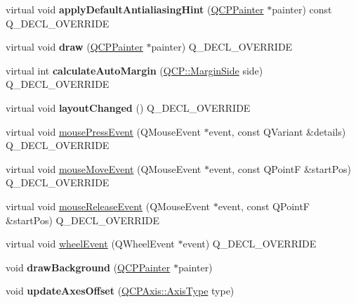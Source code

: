 \begin{DoxyCompactItemize}
\item 
\mbox{\label{classQCPAxisRect_a4a318008e2b7f881a14c3d97186b31f9}} 
virtual void {\bfseries apply\+Default\+Antialiasing\+Hint} (\hyperlink{classQCPPainter}{Q\+C\+P\+Painter} $\ast$painter) const Q\+\_\+\+D\+E\+C\+L\+\_\+\+O\+V\+E\+R\+R\+I\+DE
\item 
\mbox{\label{classQCPAxisRect_af710c50530e370539a4439d6c4db9090}} 
virtual void {\bfseries draw} (\hyperlink{classQCPPainter}{Q\+C\+P\+Painter} $\ast$painter) Q\+\_\+\+D\+E\+C\+L\+\_\+\+O\+V\+E\+R\+R\+I\+DE
\item 
\mbox{\label{classQCPAxisRect_ac51055d83f5f414b6d013d3a24b0a941}} 
virtual int {\bfseries calculate\+Auto\+Margin} (\hyperlink{namespaceQCP_a7e487e3e2ccb62ab7771065bab7cae54}{Q\+C\+P\+::\+Margin\+Side} side) Q\+\_\+\+D\+E\+C\+L\+\_\+\+O\+V\+E\+R\+R\+I\+DE
\item 
\mbox{\label{classQCPAxisRect_a575e38ac71a21906dc2d7b3364db2d62}} 
virtual void {\bfseries layout\+Changed} () Q\+\_\+\+D\+E\+C\+L\+\_\+\+O\+V\+E\+R\+R\+I\+DE
\item 
virtual void \hyperlink{classQCPAxisRect_aa9a7c807eaa4666870ac94aa6abc4dde}{mouse\+Press\+Event} (Q\+Mouse\+Event $\ast$event, const Q\+Variant \&details) Q\+\_\+\+D\+E\+C\+L\+\_\+\+O\+V\+E\+R\+R\+I\+DE
\item 
virtual void \hyperlink{classQCPAxisRect_a9cd27ad8c5cfb49aefd9dbb30def4beb}{mouse\+Move\+Event} (Q\+Mouse\+Event $\ast$event, const Q\+PointF \&start\+Pos) Q\+\_\+\+D\+E\+C\+L\+\_\+\+O\+V\+E\+R\+R\+I\+DE
\item 
virtual void \hyperlink{classQCPAxisRect_a6c89b988d3a0b93c0878f0ebdb5037f4}{mouse\+Release\+Event} (Q\+Mouse\+Event $\ast$event, const Q\+PointF \&start\+Pos) Q\+\_\+\+D\+E\+C\+L\+\_\+\+O\+V\+E\+R\+R\+I\+DE
\item 
virtual void \hyperlink{classQCPAxisRect_a93eeaa0c127d6d6fe8171b2455080262}{wheel\+Event} (Q\+Wheel\+Event $\ast$event) Q\+\_\+\+D\+E\+C\+L\+\_\+\+O\+V\+E\+R\+R\+I\+DE
\item 
\mbox{\label{classQCPAxisRect_ab49d338d1ce74b476fcead5b32cf06dc}} 
void {\bfseries draw\+Background} (\hyperlink{classQCPPainter}{Q\+C\+P\+Painter} $\ast$painter)
\item 
\mbox{\label{classQCPAxisRect_a6024ccdc74f5dc0e8a0fe482e5b28a20}} 
void {\bfseries update\+Axes\+Offset} (\hyperlink{classQCPAxis_ae2bcc1728b382f10f064612b368bc18a}{Q\+C\+P\+Axis\+::\+Axis\+Type} type)
\end{DoxyCompactItemize}
